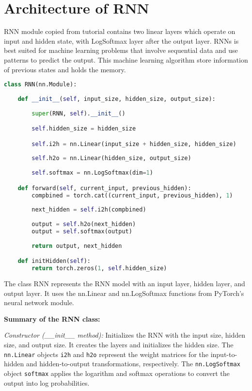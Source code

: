 \section{Architecture of \acf{RNN}}
\acs{RNN} module copied from \parencite{sean} tutorial contains two linear layers which operate on input and hidden state, with LogSoftmax layer after the output layer. \acfp{RNN} \parencite{Rumelhart.1986} is best suited for machine learning problems that involve sequential data and use patterns to predict the output. This machine learning algorithm store information of previous states and holds the memory. 
\begin{lstlisting}[language=Python,label=code:RNN-class, caption={\acf{RNN} class}]
class RNN(nn.Module):
        
    def __init__(self, input_size, hidden_size, output_size):
        
        super(RNN, self).__init__()

        self.hidden_size = hidden_size

        self.i2h = nn.Linear(input_size + hidden_size, hidden_size)
        
        self.h2o = nn.Linear(hidden_size, output_size)
        
        self.softmax = nn.LogSoftmax(dim=1)

    def forward(self, current_input, previous_hidden):
        compbined = torch.cat((current_input, previous_hidden), 1)
        
        next_hidden = self.i2h(compbined)
        
        output = self.h2o(next_hidden)
        output = self.softmax(output)
        
        return output, next_hidden

    def initHidden(self):
        return torch.zeros(1, self.hidden_size)
\end{lstlisting}

The class RNN represents the RNN model with an input layer, hidden layer, and output layer. It uses the nn.Linear and nn.LogSoftmax functions from PyTorch's neural network module.

\textbf{Summary of the RNN class:}

\textit{Constructor (\_\_init\_\_ method):} Initializes the RNN with the input size, hidden size, and output size. It creates the layers and initializes the hidden size. The \texttt{nn.Linear} objects \texttt{i2h} and \texttt{h2o} represent the weight matrices for the input-to-hidden and hidden-to-output transformations, respectively. The \texttt{nn.LogSoftmax} object \texttt{softmax} applies the logarithm and softmax operations to convert the output into log probabilities.

